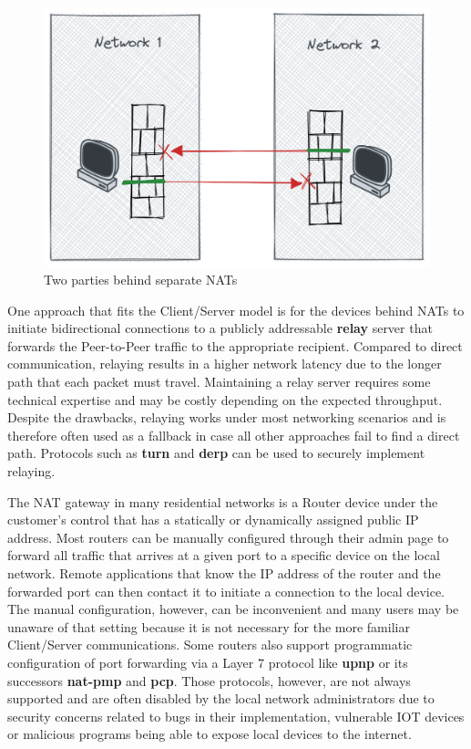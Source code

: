 \begin{figure}
\centering
\includegraphics[width=\textwidth,height=0.25\textheight]{thesis/../figures/nat-intro.png}
\caption{Two parties behind separate NATs\label{nat-intro}}
\end{figure}

One approach that fits the Client/Server model is for the devices behind
NATs to initiate bidirectional connections to a publicly addressable
\textbf{relay} server that forwards the Peer-to-Peer traffic to the
appropriate recipient. Compared to direct communication, relaying
results in a higher network latency due to the longer path that each
packet must travel. Maintaining a relay server requires some technical
expertise and may be costly depending on the expected throughput.
Despite the drawbacks, relaying works under most networking scenarios
and is therefore often used as a fallback in case all other approaches
fail to find a direct path. Protocols such as \textbf{\acrfull{turn}}
\autocite{turnRFC} and \textbf{\acrfull{derp}} \autocite{derpDocs} can
be used to securely implement relaying.

The NAT gateway in many residential networks is a Router device under
the customer's control that has a statically or dynamically assigned
public IP address. Most routers can be manually configured through their
admin page to forward all traffic that arrives at a given port to a
specific device on the local network. Remote applications that know the
IP address of the router and the forwarded port can then contact it to
initiate a connection to the local device. The manual configuration,
however, can be inconvenient and many users may be unaware of that
setting because it is not necessary for the more familiar Client/Server
communications. Some routers also support programmatic configuration of
port forwarding via a Layer 7 protocol like \textbf{\gls{upnp}} or its
successors \textbf{\gls{nat-pmp}} and \textbf{\gls{pcp}}. Those
protocols, however, are not always supported and are often disabled by
the local network administrators due to security concerns related to
bugs in their implementation, vulnerable IOT devices or malicious
programs being able to expose local devices to the internet.

